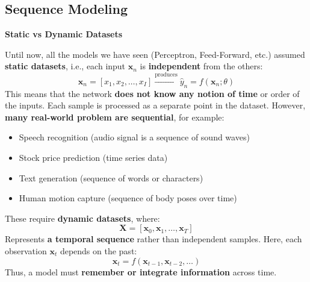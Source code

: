 \subsection{Sequence Modeling}

\begin{flushleft}
    \textcolor{Green3}{ \textbf{Static vs Dynamic Datasets}}
\end{flushleft}
Until now, all the models we have seen (Perceptron, Feed-Forward, etc.) assumed \textbf{static datasets}, i.e., each input $\mathbf{x}_{n}$ is \textbf{independent} from the others:
\begin{equation*}
    \mathbf{x}_{n} = \left[x_1, x_2, \dots, x_I\right] \xrightarrow{\text{produces}} \hat{y}_n = f\left(\mathbf{x}_{n}; \theta\right)
\end{equation*}
This means that the network \textbf{does not know any notion of time} or order of the inputs. Each sample is processed as a separate point in the dataset. However, \textbf{many real-world problem are sequential}, for example:
\begin{itemize}
    \item Speech recognition (audio signal is a sequence of sound waves)
    \item Stock price prediction (time series data)
    \item Text generation (sequence of words or characters)
    \item Human motion capture (sequence of body poses over time)
\end{itemize}
These require \textbf{dynamic datasets}, where:
\begin{equation*}
    \mathbf{X} = \left[\mathbf{x}_0, \mathbf{x}_1, \dots, \mathbf{x}_T\right]
\end{equation*}
Represents \textbf{a temporal sequence} rather than independent samples. Here, each observation $\mathbf{x}_t$ depends on the past:
\begin{equation*}
    \mathbf{x}_t = f\left(\mathbf{x}_{t-1}, \mathbf{x}_{t-2}, \dots\right)
\end{equation*}
Thus, a model must \textbf{remember or integrate information} across time.

